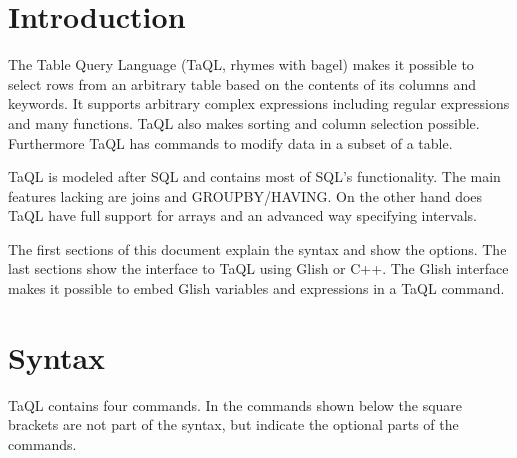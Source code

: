 

\section{Introduction}
The Table Query Language (TaQL, rhymes with bagel) makes
it possible to select
rows from an arbitrary table based on the contents of its
columns and keywords. It supports arbitrary complex
expressions including regular expressions and many functions.
TaQL also makes sorting and column selection possible.
Furthermore TaQL has commands to modify data in a subset of a table.

TaQL is modeled after SQL and contains most of SQL's functionality.
The main features lacking are joins and GROUPBY/HAVING. On the other
hand does TaQL have full support for arrays and an advanced way
specifying intervals.

The first sections of this document explain the syntax and show the options.
The last sections show the interface to TaQL using Glish or C++.
The Glish interface makes it possible to embed Glish
variables and expressions in a TaQL command.

\section{Syntax}
TaQL contains four commands.
In the commands shown below the square brackets are not part of the
syntax, but indicate the optional parts of the commands.

